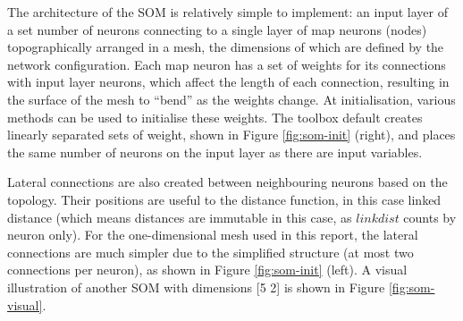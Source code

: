 \documentclass[10pt, oneside]{article}
\begin{document}
The architecture of the SOM is relatively simple to implement: an input layer of a set number of neurons connecting to a single layer of map neurons (nodes) topographically arranged in a mesh, the dimensions of which are defined by the network configuration. Each map neuron has a set of weights for its connections with input layer neurons, which affect the length of each connection, resulting in the surface of the mesh to ``bend'' as the weights change. At initialisation, various methods can be used to initialise these weights. The toolbox default creates linearly separated sets of weight, shown in Figure \ref{fig:som-init} (right), and places the same number of neurons on the input layer as there are input variables.

Lateral connections are also created between neighbouring neurons based on the topology. Their positions are useful to the distance function, in this case linked distance (which means distances are immutable in this case, as $linkdist$ counts by neuron only). For the one-dimensional mesh used in this report, the lateral connections are much simpler due to the simplified structure (at most two connections per neuron), as shown in Figure \ref{fig:som-init} (left). A visual illustration of another SOM with dimensions [5 2] is shown in Figure \ref{fig:som-visual}.
\end{document}
